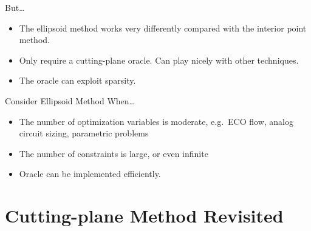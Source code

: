 \documentclass[10pt,ignorenonframetext,serif,onlymath]{beamer}
\begin{document}
\begin{frame}{But\ldots{}}
\protect\hypertarget{sec:but}{}

\begin{itemize}
\item
  The ellipsoid method works very differently compared with the interior
  point method.
\item
  Only require a cutting-plane oracle. Can play nicely with other
  techniques.
\item
  The oracle can exploit sparsity.
\end{itemize}

\end{frame}

\begin{frame}{Consider Ellipsoid Method When\ldots{}}
\protect\hypertarget{sec:consider-ellipsoid-method-when}{}

\begin{itemize}
\item
  The number of optimization variables is moderate, e.g.~ECO flow,
  analog circuit sizing, parametric problems
\item
  The number of constraints is large, or even infinite
\item
  Oracle can be implemented efficiently.
\end{itemize}

\end{frame}

\hypertarget{sec:cutting-plane-method-revisited}{%
\section{Cutting-plane Method
Revisited}\label{sec:cutting-plane-method-revisited}}
\end{document}

